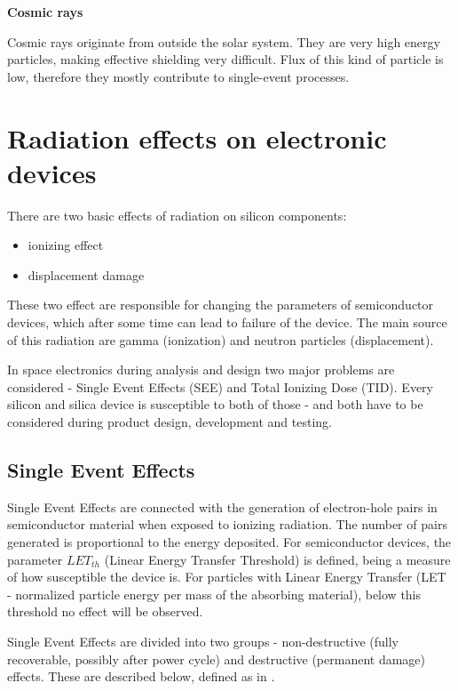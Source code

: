     \bigskip \textbf{Cosmic rays}

    Cosmic rays originate from outside the solar system. They are very high energy particles, making effective shielding very difficult. Flux of this kind of particle is low, therefore they mostly contribute to single-event processes.

\section{Radiation effects on electronic devices}
    There are two basic effects of radiation on silicon components:
    \begin{itemize}
         \item ionizing effect
        \item displacement damage
    \end{itemize}

    These two effect are responsible for changing the parameters of semiconductor devices, which after some time can lead to failure of the device. The main source of this radiation are gamma (ionization) and neutron particles (displacement).

    In space electronics during analysis and design two major problems are considered - Single Event Effects (SEE) and Total Ionizing Dose (TID). Every silicon and silica device is susceptible to both of those - and both have to be considered during product design, development and testing.

    \subsection{Single Event Effects}
        Single Event Effects are connected with the generation of electron-hole pairs in semiconductor material when exposed to ionizing radiation. The number of pairs generated is proportional to the energy deposited. For semiconductor devices, the parameter $LET_{th}$ (Linear Energy Transfer Threshold) is defined, being a measure of how susceptible the device is. For particles with Linear Energy Transfer (LET - normalized particle energy per mass of the absorbing material), below this threshold no effect will be observed.

        Single Event Effects are divided into two groups - non-destructive (fully recoverable, possibly after power cycle) and destructive (permanent damage) effects. These are described below, defined as in \cite{ECSS_Q_ST_60_15C}.

